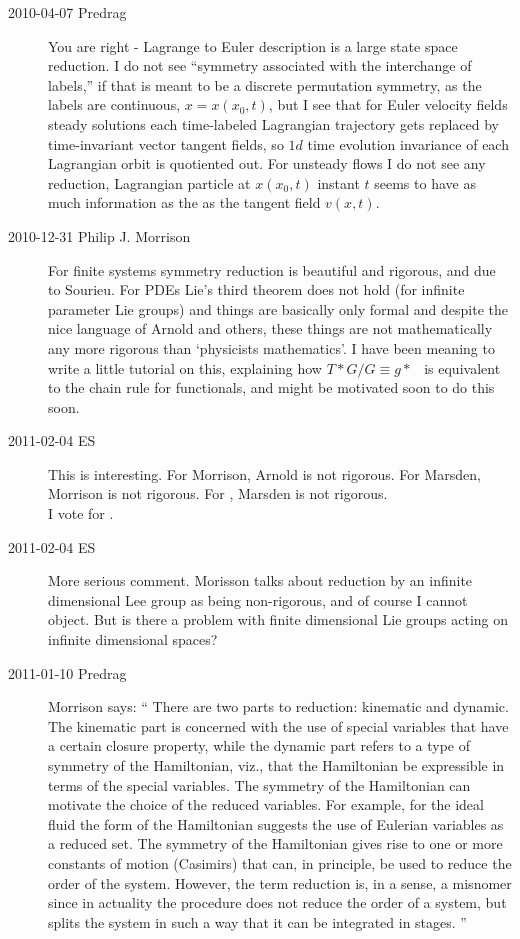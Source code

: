 \begin{description}
\item[2010-04-07 Predrag]
You are right - Lagrange to Euler description
is a large state space reduction. I do not see
``symmetry associated with the interchange of labels,''
if that is meant to be a discrete permutation symmetry, as
the labels are continuous, $x=x(x_0,t)$, but I see that
for Euler velocity fields steady solutions each time-labeled
Lagrangian trajectory gets replaced by time-invariant
vector tangent fields, so $1d$ time evolution invariance of each
Lagrangian
orbit is quotiented out. For unsteady flows I do not see any reduction,
Lagrangian particle at $x(x_0,t)$ instant $t$ seems to have as
much information as the as the tangent field $v(x,t)$.


\item[2010-12-31 Philip J. Morrison]
For finite systems symmetry reduction is beautiful and rigorous, and due
to Sourieu. For PDEs Lie's third theorem does not hold (for infinite
parameter Lie groups) and things are basically only formal and despite
the nice language of Arnold and others, these things are not
mathematically any more rigorous than `physicists mathematics'.  I have
been meaning to write a little tutorial on this, explaining how
$T*G/G\equiv g*$ \etc\ is equivalent to the chain rule for functionals,
and might be motivated soon to do this soon.

\item[2011-02-04 ES] This is interesting. For Morrison, Arnold is not rigorous.
For Marsden, Morrison is not rigorous.
For ,
Marsden is not rigorous.\\

I vote for .

\item[2011-02-04 ES] More serious comment. Morisson talks about
reduction by an infinite dimensional Lee group as being non-rigorous,
and of course I cannot object. But is there a
problem with finite dimensional Lie groups acting on infinite dimensional
spaces?

\item[2011-01-10 Predrag]
Morrison says:
``
There are two parts to reduction: kinematic and dynamic. The kinematic
part is concerned with the use of special variables that have a certain
closure property, while the dynamic part refers to a type of symmetry of
the Hamiltonian, viz., that the Hamiltonian be expressible in terms of
the special variables. The symmetry of the Hamiltonian can motivate the
choice of the reduced variables. For example, for the ideal fluid the
form of the Hamiltonian suggests the use of Eulerian variables as a
reduced set.
The symmetry of the Hamiltonian gives rise to one or more constants of
motion (Casimirs) that can, in principle, be used to reduce the order of
the system. However, the term reduction is, in a sense, a misnomer since
in actuality the procedure does not reduce the order of a system, but
splits the system in such a way that it can be integrated in stages.
''


\end{description}
